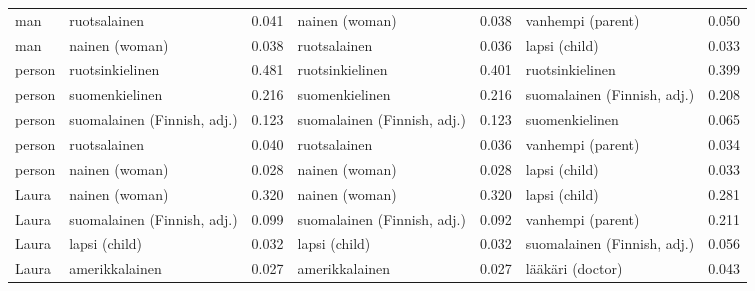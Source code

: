\begin{longtable}{llrlrlr}
   man &                ruotsalainen &                            0.041 &              nainen (woman) &                                 0.038 &           vanhempi (parent) &                           0.050 \\
   man &              nainen (woman) &                            0.038 &                ruotsalainen &                                 0.036 &               lapsi (child) &                           0.033 \\
person &             ruotsinkielinen &                            0.481 &             ruotsinkielinen &                                 0.401 &             ruotsinkielinen &                           0.399 \\
person &              suomenkielinen &                            0.216 &              suomenkielinen &                                 0.216 & suomalainen (Finnish, adj.) &                           0.208 \\
person & suomalainen (Finnish, adj.) &                            0.123 & suomalainen (Finnish, adj.) &                                 0.123 &              suomenkielinen &                           0.065 \\
person &                ruotsalainen &                            0.040 &                ruotsalainen &                                 0.036 &           vanhempi (parent) &                           0.034 \\
person &              nainen (woman) &                            0.028 &              nainen (woman) &                                 0.028 &               lapsi (child) &                           0.033 \\
 Laura &              nainen (woman) &                            0.320 &              nainen (woman) &                                 0.320 &               lapsi (child) &                           0.281 \\
 Laura & suomalainen (Finnish, adj.) &                            0.099 & suomalainen (Finnish, adj.) &                                 0.092 &           vanhempi (parent) &                           0.211 \\
 Laura &               lapsi (child) &                            0.032 &               lapsi (child) &                                 0.032 & suomalainen (Finnish, adj.) &                           0.056 \\
 Laura &              amerikkalainen &                            0.027 &              amerikkalainen &                                 0.027 &            lääkäri (doctor) &                           0.043 \\

\end{longtable}
